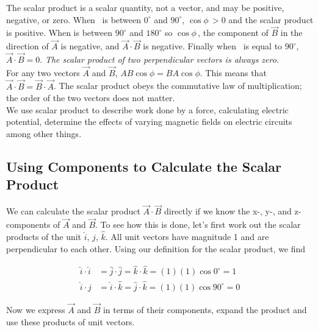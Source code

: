 The scalar product is a scalar quantity, not a vector, and may be positive, negative, or zero. When \phi\, is between $0^\circ$ and $90^\circ$, $\cos\phi\, > 0$ and the scalar product is positive. 
When \phi is between $90^\circ$ and $180^\circ$ so $\cos \phi$\,, the component of $\overrightarrow{B}$ in the direction of $\overrightarrow{A}$ is negative, and $\overrightarrow{A} \cdot \overrightarrow{B}$ is negative. Finally when \phi\, is equal to $90^\circ$, $\overrightarrow{A} \cdot \overrightarrow{B} = 0$. \textit{The scalar product of two perpendicular vectors is always zero}.\\
For any two vectors $\overrightarrow{A}$ and $\overrightarrow{B}$, $AB\cos\phi = BA\cos\phi$. This means that $\overrightarrow{A} \cdot \overrightarrow{B} = \overrightarrow{B} \cdot \overrightarrow{A}$. The scalar product obeys the commutative law of multiplication; the order of the two vectors does not matter.\\
We use scalar product to describe work done by a force, calculating electric potential, determine the effects of varying magnetic fields on electric circuits among other things.\\

\subsection*{Using Components to Calculate the Scalar Product}
We can calculate the scalar product $\overrightarrow{A} \cdot \overrightarrow{B}$ directly if we know the x-, y-, and z- components of $\overrightarrow{A}$ and $\overrightarrow{B}$. To see how this is done, let's first work out the scalar products of the unit $\hat{i}$, $\hat{j}$, $\hat{k}$. All unit vectors have magnitude 1 and are perpendicular to each other. Using our definition for the scalar product, we find
\begin{mathbox}
\begin{align*}
\hat{i} \cdot \hat{i} &= \hat{j} \cdot \hat{j} = \hat{k} \cdot \hat{k} = \left(1\right) \left(1\right) \cos 0^\circ = 1\\
\hat{i} \cdot \hat{j} &= \hat{i} \cdot \hat{k} = \hat{j} \cdot \hat{k} = \left(1\right) \left(1\right) \cos 90^\circ = 0
\end{align*}
\end{mathbox}

Now we express $\overrightarrow{A}$ and $\overrightarrow{B}$ in terms of their components, expand the product and use these products of unit vectors.

